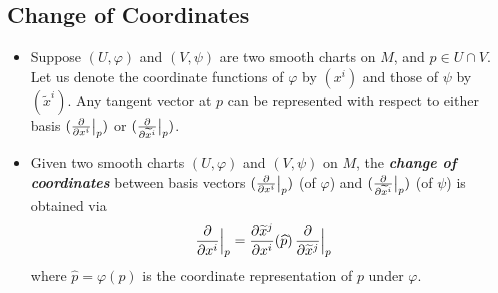 \documentclass[11pt]{article}
\begin{document}
\subsection{Change of Coordinates}
\begin{itemize}
\item Suppose $(U, \varphi)$ and $(V, \psi)$ are two smooth charts on $M$, and $p \in U \cap V$. Let us denote the coordinate functions of $\varphi$ by $(x^i)$ and those of $\psi$ by $(\widetilde{x}^i)$. Any tangent vector at $p$ can be represented with respect to either basis $(\frac{\partial }{ \partial x^{i}}\big|_{p})$ or $(\frac{\partial }{ \partial \widetilde{x}^{i}}\big|_{p})$. 

\item \begin{remark}
Given two smooth charts $(U, \varphi)$ and $(V, \psi)$ on $M$, the \emph{\textbf{change of coordinates}} between basis vectors $(\frac{\partial }{ \partial x^{i}}\big|_{p})$ (of $\varphi$) and $(\frac{\partial }{ \partial \widetilde{x}^{i}}\big|_{p})$ (of $\psi$) is obtained via
\begin{align}
\frac{\partial }{ \partial x^{i}}\Bigr|_{p} &=  \frac{\partial \widetilde{x}^{j}}{ \partial x^{i}}(\widehat{p})\,\frac{\partial }{ \partial \widetilde{x}^{j}}\Bigr|_{p}   \label{eqn: change_of_coordinates}
\end{align} where $\widehat{p} = \varphi(p)$ is the coordinate representation of $p$ under $\varphi$. 
\end{remark}
\end{itemize}
\end{document}
